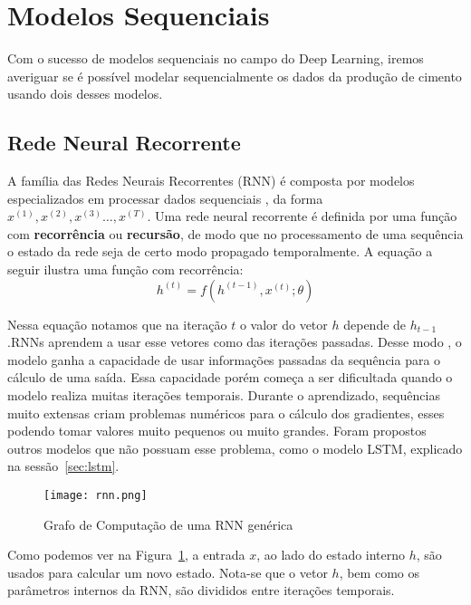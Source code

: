 \section{Modelos Sequenciais}
Com o sucesso de modelos sequenciais no campo do Deep Learning, iremos averiguar se é possível modelar sequencialmente os dados da produção de cimento usando dois desses modelos. 

\subsection{Rede Neural Recorrente}
% 

A família das Redes Neurais Recorrentes (RNN) é composta por modelos especializados
em processar dados sequenciais \citep{dlbook}, da forma $x^{(1)},x^{(2)} ,x^{(3)}\dots ,x^{(T)}$. Uma rede neural recorrente é definida por uma função com
\textbf{recorrência} ou \textbf{recursão}, de modo que no processamento de uma
sequência o estado da rede seja de certo modo propagado temporalmente. A equação
a seguir ilustra uma função com recorrência: \\

\[h^{(t)} = f(h^{(t-1)},x^{(t)};\theta)\]

Nessa equação notamos que na iteração $t$ o valor do vetor $h$ depende de
$h_{t-1}$.RNNs aprendem a usar esse vetores como
 das iterações passadas. Desse modo , o modelo ganha a capacidade
de usar informações passadas da sequência para o cálculo
de uma saída. Essa capacidade porém começa a ser dificultada quando o modelo
realiza muitas iterações temporais. Durante o aprendizado, sequências muito
extensas criam problemas numéricos para o cálculo dos gradientes, esses podendo
tomar valores muito pequenos ou muito grandes. Foram propostos outros modelos
que não possuam esse problema, como o modelo LSTM, explicado na sessão~\ref{sec:lstm}. 

\begin{figure}[H]
\centering
\texttt{[image: rnn.png]}
\caption{Grafo de Computação de uma RNN genérica \citep{dlbook}}
\label{fig:rnngraph}
\end{figure}

Como podemos ver na Figura~\ref{fig:rnngraph}, a entrada $x$, ao lado do estado
interno $h$, são usados para calcular um novo estado. Nota-se que o vetor $h$,
bem como os parâmetros internos da RNN, são divididos entre iterações temporais.
\\

